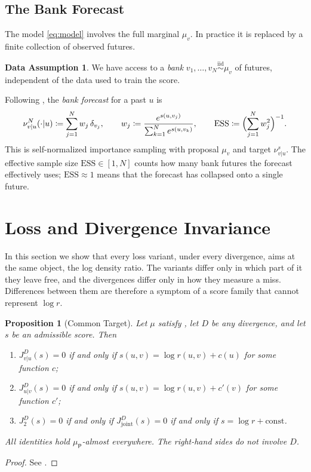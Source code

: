 \documentclass[11pt]{article}
\theoremstyle{plain}
\newtheorem{proposition}[theorem]{Proposition}
\theoremstyle{definition}
\newtheorem{dataAssumption}[theorem]{Data Assumption}
\theoremstyle{remark}
\newcommand{\define}{\coloneqq}
\newcommand{\muP}{\mu_{\mathsf{P}}}
\newcommand{\ESS}{\mathrm{ESS}}
\newcommand{\Jvu}{J_{v\vert u}}
\newcommand{\Juv}{J_{u\vert v}}
\newcommand{\Jtwo}{J_{2}}
\newcommand{\Jjoint}{J_{\mathrm{joint}}}
\begin{document}
\subsection{The Bank Forecast}
\label{ssec:bankdef}

The model \eqref{eq:model} involves the full marginal $\mu_v$. In practice it
is replaced by a finite collection of observed futures.

\begin{dataAssumption}
 \label{dass:bank}
 We have access to a \emph{bank} $v_1,\ldots,v_N\overset{\mathrm{iid}}{\sim}\mu_v$
 of futures, independent of the data used to train the score.
\end{dataAssumption}

Following \cite[Eq.~(31)]{baptista2025mathematical}, the \emph{bank forecast}
for a past $u$ is
\begin{equation}
 \nu^{N}_{v\vert u}(\cdot\vert u)\define\sum_{j=1}^{N}w_j\,\delta_{v_j},\qquad
 w_j\define\frac{e^{s(u,v_j)}}{\sum_{k=1}^{N}e^{s(u,v_k)}},\qquad
 \ESS\define\Bigl(\sum_{j=1}^{N}w_j^{2}\Bigr)^{-1}.
 \label{eq:bank}
\end{equation}
This is self-normalized importance sampling with proposal $\mu_v$ and target
$\nu^{s}_{v\vert u}$. The effective sample size $\ESS\in[1,N]$ counts how
many bank futures the forecast effectively uses; $\ESS\approx1$ means that
the forecast has collapsed onto a single future.

\section{Loss and Divergence Invariance}
\label{sec:invariance}

In this section we show that every loss variant, under every divergence,
aims at the same object, the log density ratio. The variants differ only in
which part of it they leave free, and the divergences differ only in how they
measure a miss. Differences between them are therefore a symptom of a score
family that cannot represent $\log r$.

\begin{proposition}[Common Target]
 \label{prop:target}
 Let $\mu$ satisfy , let $D$ be any divergence, and let $s$ be
 an admissible score. Then
 \begin{enumerate}[label=(\roman*)]
  \item $\Jvu^{D}(s)=0$ if and only if $s(u,v)=\log r(u,v)+c(u)$ for some
        function $c$;
  \item $\Juv^{D}(s)=0$ if and only if $s(u,v)=\log r(u,v)+c'(v)$ for some
        function $c'$;
  \item $\Jtwo^{D}(s)=0$ if and only if $\Jjoint^{D}(s)=0$ if and only if
        $s=\log r+\mathrm{const}$.
 \end{enumerate}
 All identities hold $\muP$-almost everywhere. The right-hand sides do not
 involve $D$.
\end{proposition}
\begin{proof}
 See .
\end{proof}
\end{document}
